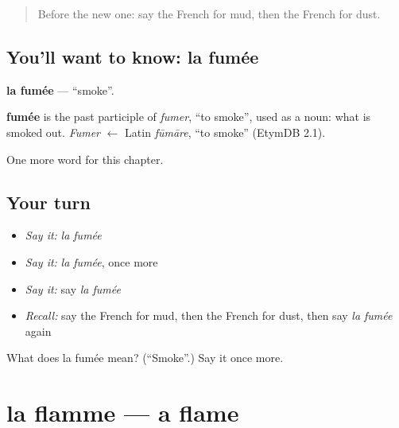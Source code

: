 \label{lesson:FR-C201-fumee}



\begin{quote}
Before the new one: say the French for mud, then the French for dust.
\end{quote}

\subsection*{You'll want to know: la fumée}
\textbf{la fumée} — \textquotedblleft{}smoke\textquotedblright{}.

\begin{cousinweb}
\textbf{fumée} is the past participle of \emph{fumer}, \textquotedblleft{}to smoke\textquotedblright{}, used as a noun: what is smoked out. \emph{Fumer} $\leftarrow$ Latin \emph{fūmāre}, \textquotedblleft{}to smoke\textquotedblright{} (EtymDB 2.1).
\end{cousinweb}

\begin{grammarlens}[title={What you've built}]
One more word for this chapter.
\end{grammarlens}

\subsection*{Your turn}
\begin{itemize}
\raggedright
  \item \emph{Say it:} \emph{la fumée}
  \item \emph{Say it:} \emph{la fumée}, once more
  \item \emph{Say it:} say \emph{la fumée}
  \item \emph{Recall:} say the French for mud, then the French for dust, then say \emph{la fumée} again
\end{itemize}

\begin{tcolorbox}[breakable,colback=teal!4,colframe=teal!35!black,title={Before you move on}]
What does la fumée mean? (\textquotedblleft{}Smoke\textquotedblright{}.) Say it once more.
\end{tcolorbox}
\section[la flamme]{la flamme — a flame}

\label{lesson:FR-C201-flamme}



